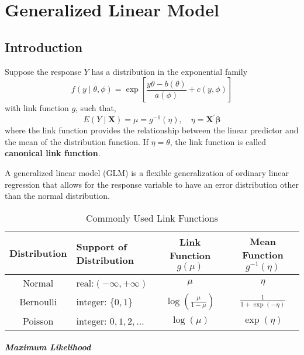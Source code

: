 \chapter{Generalized Linear Model}

\section{Introduction}

Suppose the response $Y$ has a distribution in the exponential family
\begin{equation*}
	f\left(y\mid\theta,\phi\right)=\exp\left[\frac{y\theta-b(\theta)}{a(\phi)}+c(y,\phi)\right]
\end{equation*}
with link function $g$, such that,
\begin{equation}
	E\left(Y\mid\mathbf{X}\right)=\mu=g^{-1}(\eta),\quad\eta=\mathbf{X}^{\prime}\boldsymbol{\beta}
\end{equation}
where the link function provides the relationship between the linear predictor and the mean of the distribution function. If $\eta=\theta$, the link function is called \textbf{canonical link function}.

\begin{remark}
	A generalized linear model (GLM) is a flexible generalization of ordinary linear regression that allows for the response variable to have an error distribution other than the normal distribution.
\end{remark}

\begin{table}[hpt]
	\centering
	\caption{Commonly Used Link Functions}
	\begin{tabular}{clcc}
		\toprule
		Distribution & Support of Distribution  & Link Function $g(\mu)$               & Mean Function $g^{-1}(\eta)$ \\
		\midrule
		Normal       & real:$(-\infty,+\infty)$ & $\mu$                                & $\eta$                       \\
		Bernoulli    & integer: $\{0,1\}$       & $\log\left(\frac{\mu}{1-\mu}\right)$ & $\frac{1}{1+\exp(-\eta)}$    \\
		Poisson      & integer: $0,1,2,\ldots$  & $\log\left(\mu\right)$               & $\exp\left(\eta\right)$      \\
		\bottomrule
	\end{tabular}
\end{table}

\paragraph{Maximum Likelihood}

